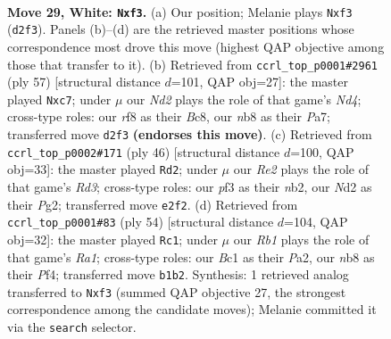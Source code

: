 \documentclass[11pt]{article}
\begin{document}
\clearpage

\begin{figure}[p]\centering
\begin{subfigure}{0.46\textwidth}\centering
\resizebox{\linewidth}{!}{%
\newchessgame
\chessboard[
  setfen={1n3r1k/1B4b1/rP3n2/p3p3/b1P5/4NpP1/3NR3/1RB3K1 w - - 0 29},
  showmover=false,
  pgfstyle=straightmove, color=movearrow, markmove={d2-f3}
]}
\caption{}
\end{subfigure}\hfill
\begin{subfigure}{0.46\textwidth}\centering
\resizebox{\linewidth}{!}{%
\newchessgame
\chessboard[
  setfen={2br2k1/p1P4p/4ppp1/1r1n4/2N4P/B5P1/P4PB1/2R3K1 b - - 0 29},
  showmover=false,
  pgfstyle=straightmove, color=movearrow, markmove={d5-c7}
]}
\caption{}
\end{subfigure}
\\[4pt]
\begin{subfigure}{0.46\textwidth}\centering
\resizebox{\linewidth}{!}{%
\newchessgame
\chessboard[
  setfen={2b2rk1/4p2p/pp4p1/2rP4/3BP3/P1NR4/1n4PP/4K2R w K - 0 24},
  showmover=false,
  pgfstyle=straightmove, color=movearrow, markmove={d3-d2}
]}
\caption{}
\end{subfigure}\hfill
\begin{subfigure}{0.46\textwidth}\centering
\resizebox{\linewidth}{!}{%
\newchessgame
\chessboard[
  setfen={2r2r1k/p1N1R3/1pN2bp1/7b/3P1P2/8/PP3P2/R5K1 w - - 1 28},
  showmover=false,
  pgfstyle=straightmove, color=movearrow, markmove={a1-c1}
]}
\caption{}
\end{subfigure}
\caption{\textbf{Move 29, White: \texttt{Nxf3}.} (a) Our position; Melanie plays \texttt{Nxf3} (\texttt{d2f3}). Panels (b)--(d) are the retrieved master positions whose correspondence most drove this move (highest QAP objective among those that transfer to it). (b) Retrieved from \texttt{ccrl\_top\_p0001\#2961} (ply 57) [structural distance $d$=101, QAP obj=27]: the master played \texttt{Nxc7}; under $\mu$ our \emph{Nd2} plays the role of that game's \emph{Nd4}; cross-type roles: our \emph{r}f8 as their \emph{B}c8, our \emph{n}b8 as their \emph{P}a7; transferred move \texttt{d2f3} \textbf{(endorses this move)}. (c) Retrieved from \texttt{ccrl\_top\_p0002\#171} (ply 46) [structural distance $d$=100, QAP obj=33]: the master played \texttt{Rd2}; under $\mu$ our \emph{Re2} plays the role of that game's \emph{Rd3}; cross-type roles: our \emph{p}f3 as their \emph{n}b2, our \emph{N}d2 as their \emph{P}g2; transferred move \texttt{e2f2}. (d) Retrieved from \texttt{ccrl\_top\_p0001\#83} (ply 54) [structural distance $d$=104, QAP obj=32]: the master played \texttt{Rc1}; under $\mu$ our \emph{Rb1} plays the role of that game's \emph{Ra1}; cross-type roles: our \emph{B}c1 as their \emph{P}a2, our \emph{n}b8 as their \emph{P}f4; transferred move \texttt{b1b2}. Synthesis: 1 retrieved analog transferred to \texttt{Nxf3} (summed QAP objective 27, the strongest correspondence among the candidate moves); Melanie committed it via the \texttt{search} selector.}
\label{fig:thought-m56}
\end{figure}
\end{document}
